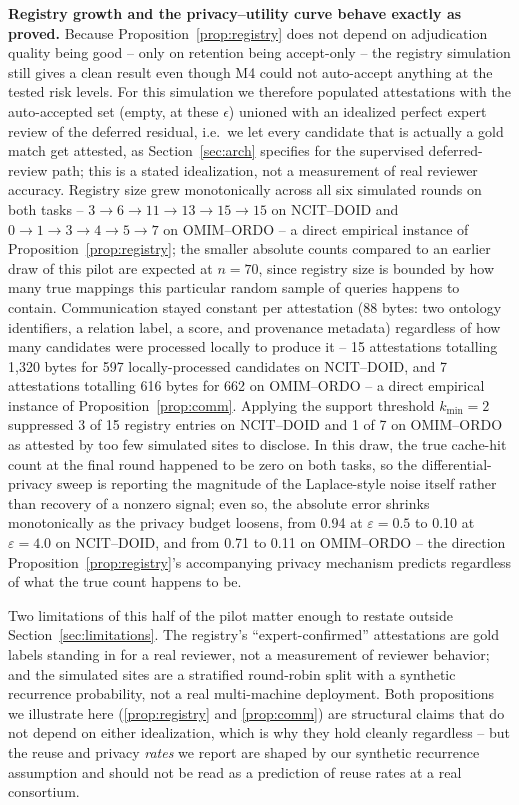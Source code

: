 \documentclass[conference]{IEEEtran}
\begin{document}
\textbf{Registry growth and the privacy--utility curve behave exactly as proved.} Because Proposition~\ref{prop:registry} does not depend on adjudication quality being good -- only on retention being accept-only -- the registry simulation still gives a clean result even though M4 could not auto-accept anything at the tested risk levels. For this simulation we therefore populated attestations with the auto-accepted set (empty, at these $\epsilon$) unioned with an idealized perfect expert review of the deferred residual, i.e.\ we let every candidate that is actually a gold match get attested, as Section~\ref{sec:arch} specifies for the supervised deferred-review path; this is a stated idealization, not a measurement of real reviewer accuracy. Registry size grew monotonically across all six simulated rounds on both tasks -- $3\to6\to11\to13\to15\to15$ on NCIT--DOID and $0\to1\to3\to4\to5\to7$ on OMIM--ORDO -- a direct empirical instance of Proposition~\ref{prop:registry}; the smaller absolute counts compared to an earlier draw of this pilot are expected at $n{=}70$, since registry size is bounded by how many true mappings this particular random sample of queries happens to contain. Communication stayed constant per attestation (88 bytes: two ontology identifiers, a relation label, a score, and provenance metadata) regardless of how many candidates were processed locally to produce it -- 15 attestations totalling 1{,}320 bytes for 597 locally-processed candidates on NCIT--DOID, and 7 attestations totalling 616 bytes for 662 on OMIM--ORDO -- a direct empirical instance of Proposition~\ref{prop:comm}. Applying the support threshold $k_{\min}=2$ suppressed 3 of 15 registry entries on NCIT--DOID and 1 of 7 on OMIM--ORDO as attested by too few simulated sites to disclose. In this draw, the true cache-hit count at the final round happened to be zero on both tasks, so the differential-privacy sweep is reporting the magnitude of the Laplace-style noise itself rather than recovery of a nonzero signal; even so, the absolute error shrinks monotonically as the privacy budget loosens, from 0.94 at $\varepsilon{=}0.5$ to 0.10 at $\varepsilon{=}4.0$ on NCIT--DOID, and from 0.71 to 0.11 on OMIM--ORDO -- the direction Proposition~\ref{prop:registry}'s accompanying privacy mechanism predicts regardless of what the true count happens to be.

Two limitations of this half of the pilot matter enough to restate outside Section~\ref{sec:limitations}. The registry's ``expert-confirmed'' attestations are gold labels standing in for a real reviewer, not a measurement of reviewer behavior; and the simulated sites are a stratified round-robin split with a synthetic recurrence probability, not a real multi-machine deployment. Both propositions we illustrate here (\ref{prop:registry} and \ref{prop:comm}) are structural claims that do not depend on either idealization, which is why they hold cleanly regardless -- but the reuse and privacy \emph{rates} we report are shaped by our synthetic recurrence assumption and should not be read as a prediction of reuse rates at a real consortium.
\end{document}

